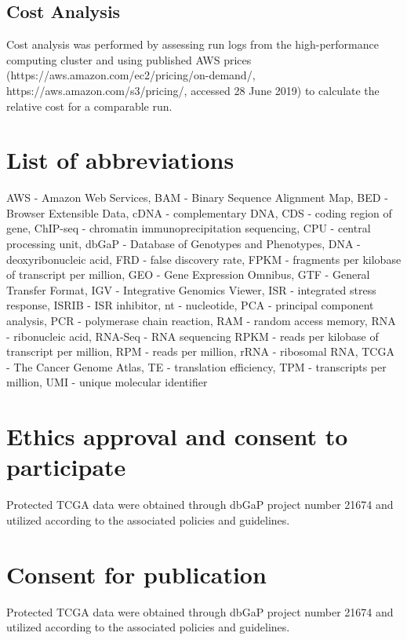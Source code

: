 \documentclass[10pt, oneside]{article}
\begin{document}
\subsection{Cost Analysis}
Cost analysis was performed by assessing run logs from the high-performance computing cluster and using published AWS prices (https://aws.amazon.com/ec2/pricing/on-demand/, https://aws.amazon.com/s3/pricing/, accessed 28 June 2019) to calculate the relative cost for a comparable run.

\section*{List of abbreviations}
AWS - Amazon Web Services,
BAM - Binary Sequence Alignment Map,
BED - Browser Extensible Data,
cDNA - complementary DNA,
CDS - coding region of gene,
ChIP-seq - chromatin immunoprecipitation sequencing,
CPU - central processing unit,
dbGaP - Database of Genotypes and Phenotypes,
DNA - deoxyribonucleic acid,
FRD - false discovery rate,
FPKM - fragments per kilobase of transcript per million,
GEO - Gene Expression Omnibus,
GTF - General Transfer Format,
IGV - Integrative Genomics Viewer,
ISR - integrated stress response,
ISRIB - ISR inhibitor,
nt - nucleotide,
PCA - principal component analysis,
PCR - polymerase chain reaction,
RAM - random access memory,
RNA - ribonucleic acid,
RNA-Seq - RNA sequencing
RPKM - reads per kilobase of transcript per million,
RPM - reads per million,
rRNA - ribosomal RNA,
TCGA - The Cancer Genome Atlas,
TE - translation efficiency,
TPM - transcripts per million,
UMI - unique molecular identifier

\section*{Ethics approval and consent to participate}
Protected TCGA data were obtained through dbGaP project number 21674 and utilized according to the associated policies and guidelines.

\section*{Consent for publication}
Protected TCGA data were obtained through dbGaP project number 21674 and utilized according to the associated policies and guidelines.
\end{document}
